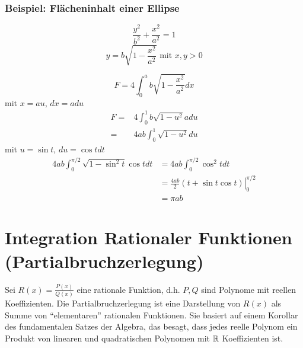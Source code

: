 \begin{enumerate}
\subsubsection*{Beispiel: Flächeninhalt einer Ellipse}

\begin{figure}[ht]
\begin{minipage}[b]{0.45\linewidth}
\centering
{}

\end{minipage}
\hspace{0.5cm}
\begin{minipage}[b]{0.45\linewidth}

\centering
\[\frac{y^2}{b^2}+\frac{x^2}{a^2}=1\]
\[y=b\sqrt{1-\frac{x^2}{a^2}}\text{ mit }x,y>0\]

\end{minipage}
\end{figure}
\[F=4\int ^{a}_{0}b\sqrt {1-\dfrac {x^{2}}{a^{2}}}dx\]
mit $x=au$, $dx=adu$
\begin{align*}
F=&4\int ^{1}_{0}b\sqrt {1-u^2}adu\\
=&4ab\int ^{1}_{0}\sqrt {1-u^2}du
\end{align*}
mit $u=\sin t$, $du=\cos tdt$
\begin{align*}
4ab\int ^{\pi /2}_{0}\sqrt {1-\sin^2t}\cos t dt &=4ab\int ^{\pi /2}_{0}\cos ^{2}tdt\\
&=\left.\frac{4ab}{2}\left( t+\sin t\cos t\right) \right| ^{\pi /2}_{0}\\
&=\pi ab
\end{align*}
\end{enumerate}



\section{Integration Rationaler Funktionen (Partialbruchzerlegung)}
Sei $R(x)=\frac{P(x)}{Q(x)}$ eine rationale Funktion, d.h. $P,Q$ sind Polynome mit reellen Koeffizienten. Die Partialbruchzerlegung ist eine Darstellung von $R(x)$ als Summe von ``elementaren'' rationalen Funktionen. Sie basiert auf einem Korollar des fundamentalen Satzes der Algebra, das besagt, dass jedes reelle Polynom ein Produkt von linearen und quadratischen Polynomen mit $\mathbb{R}$ Koeffizienten ist.

